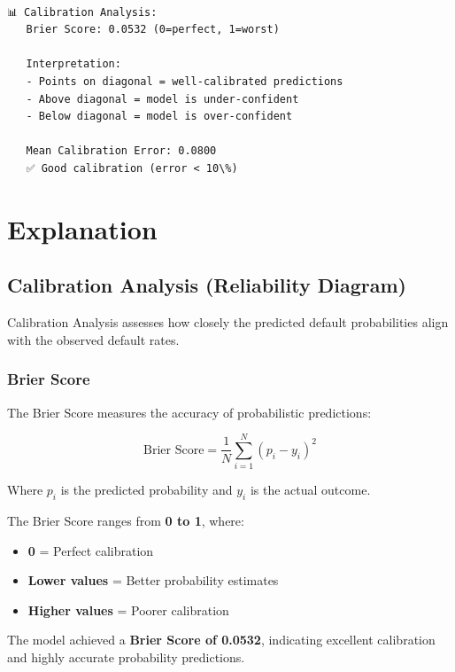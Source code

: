 \documentclass[11pt]{article}
\providecommand{\tightlist}{%
      \setlength{\itemsep}{0pt}\setlength{\parskip}{0pt}}
\begin{document}
    \begin{Verbatim}[commandchars=\\\{\}]

📊 Calibration Analysis:
   Brier Score: 0.0532 (0=perfect, 1=worst)

   Interpretation:
   - Points on diagonal = well-calibrated predictions
   - Above diagonal = model is under-confident
   - Below diagonal = model is over-confident

   Mean Calibration Error: 0.0800
   ✅ Good calibration (error < 10\%)
    \end{Verbatim}

    \section{Explanation}\label{explanation}

\subsection{Calibration Analysis (Reliability
Diagram)}\label{calibration-analysis-reliability-diagram}

Calibration Analysis assesses how closely the predicted default
probabilities align with the observed default rates.

\subsubsection{Brier Score}\label{brier-score}

The Brier Score measures the accuracy of probabilistic predictions:

\[
\text{Brier Score} = \frac{1}{N}\sum_{i=1}^{N}(p_i-y_i)^2
\]

Where \(p_i\) is the predicted probability and \(y_i\) is the actual
outcome.

The Brier Score ranges from \textbf{0 to 1}, where:

\begin{itemize}
\tightlist
\item
  \textbf{0} = Perfect calibration
\item
  \textbf{Lower values} = Better probability estimates
\item
  \textbf{Higher values} = Poorer calibration
\end{itemize}

The model achieved a \textbf{Brier Score of 0.0532}, indicating
excellent calibration and highly accurate probability predictions.
\end{document}
